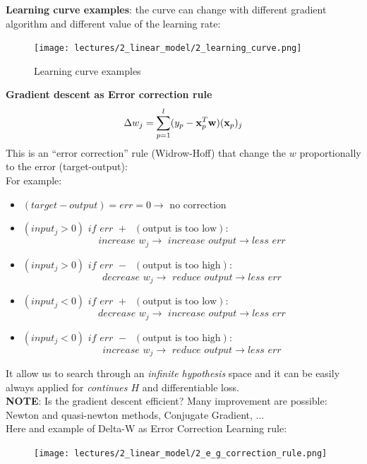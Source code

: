 \documentclass[../main.tex]{subfiles}
\begin{document}
\noindent \textbf{Learning curve examples}: the curve can change with different gradient algorithm and different value of the learning rate:
\begin{figure}[H]
    \centering
    \texttt{[image: lectures/2\_linear\_model/2\_learning\_curve.png]}
    \caption{Learning curve examples}
    \label{fig:2_learning_curve}
\end{figure}
\noindent \textbf{Gradient descent as
Error correction rule}\\
$$\Delta w_j = \sum_{p = 1}^{l} (y_p - \bold{x}_p^T\bold{w})(\bold{x}_p)_j$$
This is an “error correction” rule (Widrow-Hoff) that change the $w$ proportionally to the error (target-output):\\
For example:
\begin{itemize}
    \item $(target - output) = err=0 \rightarrow$ no correction
    
    \item $(input_j>0)\,\, if\,\,err\,\,+ \;\; (\text{output is too low}):$
    $$increase\,\, w_j \rightarrow\,\, increase\,\, output \rightarrow less\,\, err$$
    
    \item $(input_j>0)\,\, if\,\,err\,\,-\;\;(\text{output is too high}): $
    $$decrease\,\, w_j \rightarrow\,\, reduce\,\, output \rightarrow less\,\, err$$

    \item $(input_j<0)\,\, if\,\,err\,\,+\;\;(\text{output is too low}): $
    $$decrease\,\, w_j \rightarrow\,\, increase\,\, output \rightarrow less\,\, err$$  

    \item $(input_j<0)\,\, if\,\,err\,\,- \;\; (\text{output is too high}):$
    $$increase\,\, w_j \rightarrow\,\, reduce\,\, output \rightarrow less\,\, err$$
    

    

   
\end{itemize}
It allow us to search through an \emph{infinite hypothesis} space and it can be easily always applied for \emph{continues $H$} and differentiable loss.\\

\textbf{NOTE}: Is the gradient descent efficient? Many improvement are possible: Newton and quasi-newton methods, Conjugate Gradient, ...\\

Here and example of Delta-W as Error Correction Learning rule:
\begin{figure}[H]
    \centering
    \texttt{[image: lectures/2\_linear\_model/2\_e\_g\_correction\_rule.png]}
\end{figure}
\end{document}
